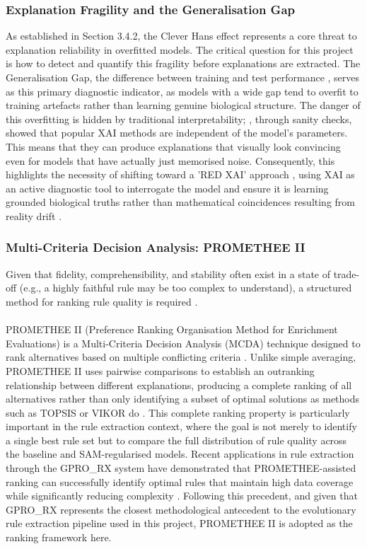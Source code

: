 \subsubsection{Explanation Fragility and the Generalisation Gap}
As established in Section 3.4.2, the Clever Hans effect represents a core threat to explanation reliability in 
overfitted models. The critical question for this project is how to detect and quantify this fragility before 
explanations are extracted. The Generalisation Gap, the difference between training and test performance 
\cite{Keskar2016,Springer2024}, serves as this primary diagnostic indicator, as models with a 
wide gap tend to overfit to training artefacts rather than learning genuine biological structure. The danger of 
this overfitting is hidden by traditional interpretability; \cite{Adebayo2018}, through sanity checks, showed 
that popular XAI methods are independent of the model’s parameters. This means that they can produce explanations 
that visually look convincing even for models that have actually just memorised noise. Consequently, this highlights 
the necessity of shifting toward a 'RED XAI' approach \cite{Biecek2024}, using XAI as an active diagnostic tool to 
interrogate the model and ensure it is learning grounded biological truths rather than mathematical coincidences resulting 
from reality drift \cite{Longo2024}.

\subsubsection{Multi-Criteria Decision Analysis: PROMETHEE II}
Given that fidelity, comprehensibility, and stability often exist in a state of trade-off (e.g., a highly 
faithful rule may be too complex to understand), a structured method for ranking rule quality is required 
\cite{Yedjour2024,Ye2024,Brans1985}.
\\\\
PROMETHEE II (Preference Ranking Organisation Method for Enrichment Evaluations) is a Multi-Criteria Decision 
Analysis (MCDA) technique designed to rank alternatives based on multiple conflicting criteria 
\cite{Yedjour2024,Matejova2025}. Unlike simple averaging, PROMETHEE II uses pairwise comparisons 
to establish an outranking relationship between different explanations, producing a complete ranking of all 
alternatives rather than only identifying a subset of optimal solutions as methods such as TOPSIS or VIKOR do 
\cite{Yedjour2024,Matejova2025}. This complete ranking property is particularly important in 
the rule extraction context, where the goal is not merely to identify a single best rule set but to compare the 
full distribution of rule quality across the baseline and SAM-regularised models. Recent applications in rule 
extraction through the GPRO\_RX system have demonstrated that PROMETHEE-assisted ranking can successfully 
identify optimal rules that maintain high data coverage while significantly reducing complexity 
\cite{Yedjour2024}. Following this precedent, and given that GPRO\_RX represents the closest methodological 
antecedent to the evolutionary rule extraction pipeline used in this project, PROMETHEE II is adopted as the 
ranking framework here.  

